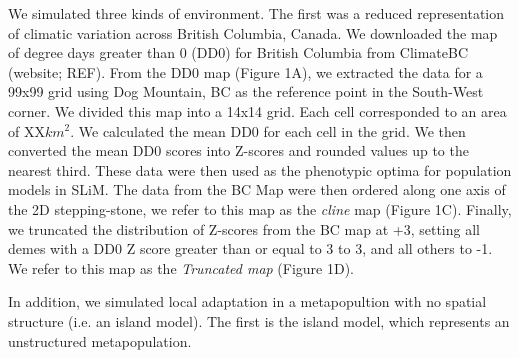 \documentclass[11pt,twoside,lineno]{GSA_format}
\begin{document}

We simulated three kinds of environment. The first was a reduced representation of climatic variation across British Columbia, Canada. We downloaded the map of degree days greater than 0 (DD0) for British Columbia from ClimateBC (website; REF). From the DD0 map (Figure 1A), we extracted the data for a 99x99 grid using Dog Mountain, BC as the reference point in the South-West corner. We divided this map into a 14x14 grid. Each cell corresponded to an area of XX$km^2$. We calculated the mean DD0 for each cell in the grid. We then converted the mean DD0 scores into Z-scores and rounded values up to the nearest third. These data were then used as the phenotypic optima for population models in SLiM. The data from the BC Map were then ordered along one axis of the 2D stepping-stone, we refer to this map as the \textit{cline} map (Figure 1C). Finally, we truncated the distribution of Z-scores from the BC map at +3, setting all demes with a DD0 Z score greater than or equal to 3 to 3, and all others to -1. We refer to this map as the \textit{Truncated map} (Figure 1D).

In addition, we simulated local adaptation in a metapopultion with no spatial structure (i.e. an island model).  The first is the island model, which represents an unstructured metapopulation. 

\end{document}
